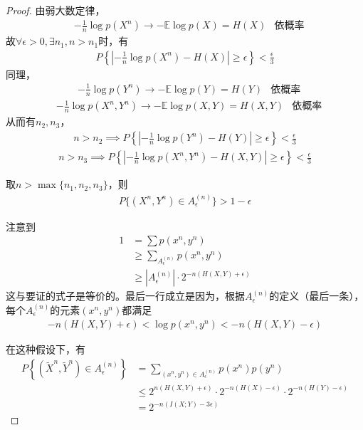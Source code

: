 \documentclass{ctexbook}
\begin{document}
\begin{proof}
    由弱大数定律，\begin{align*}
        &-\frac{1}{n}\log p(X^n)\to -\mathbb{E} \log p(X)=H(X)&\text{依概率}
    \end{align*}
    故$\forall \epsilon>0,\exists n_1,n>n_1$时，有\begin{align*}
        P\left\{\left|-\frac{1}{n}\log p(X^n)-H(X)\right|\geq \epsilon\right\}<\frac{\epsilon}{3}
    \end{align*}
    同理，\begin{align*}
        &-\frac{1}{n}\log p(Y^n)\to -\mathbb{E} \log p(Y)=H(Y)&\text{依概率}
    \end{align*}\begin{align*}
        &-\frac{1}{n}\log p(X^n,Y^n)\to -\mathbb{E} \log p(X,Y)=H(X,Y)&\text{依概率}
    \end{align*}
    从而有$n_2,n_3$，\begin{align*}
        n>n_2\implies P\left\{\left|-\frac{1}{n}\log p(Y^n)-H(Y)\right|\geq \epsilon\right\}<\frac{\epsilon}{3}
    \end{align*}\begin{align*}
        n>n_3\implies P\left\{\left|-\frac{1}{n}\log p(X^n,Y^n)-H(X,Y)\right|\geq \epsilon\right\}<\frac{\epsilon}{3}
    \end{align*}
    
    取$n>\max\{n_1,n_2,n_3\}$，则
    \begin{align*}
        P\{(X^n,Y^n)\in A^{(n)}_{\epsilon}\}>1-\epsilon
    \end{align*}

    注意到\begin{align*}
        1&=\sum p(x^n,y^n)\\
        &\geq \sum_{A^{(n)}_{\epsilon}}p(x^n,y^n)\\
        &\geq |A^{(n)}_{\epsilon}|\cdot 2^{-n(H(X,Y)+\epsilon)}
    \end{align*}
    这与要证的式子是等价的。最后一行成立是因为，根据$A^{(n)}_{\epsilon}$的定义（最后一条），每个$A^{(n)}_{\epsilon}$的元素$(x^n,y^n)$都满足\begin{align*}
        -n(H(X,Y)+\epsilon)<\log p(x^n,y^n)<-n(H(X,Y)-\epsilon)
    \end{align*}
    
    在这种假设下，有\begin{align*}
        P\left\{\left(\tilde{X}^n,\tilde{Y}^n\right)\in A^{(n)}_{\epsilon}\right\}&=\sum_{(x^n,y^n)\in A^{(n)}_{\epsilon}}p(x^n)p(y^n)\\
        &\leq 2^{n(H(X,Y)+\epsilon)}\cdot 2^{-n(H(X)-\epsilon)}\cdot 2^{-n(H(Y)-\epsilon)}\\
        &=2^{-n(I(X;Y)-3\epsilon)}
    \end{align*}


\end{proof}
\end{document}
